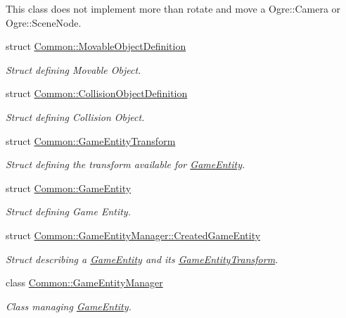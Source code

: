 \begin{DoxyCompactItemize}
\begin{DoxyCompactList}
This class does not implement more than rotate and move a Ogre\+::\+Camera or Ogre\+::\+Scene\+Node. \end{DoxyCompactList}\item 
struct \hyperlink{struct_common_1_1_movable_object_definition}{Common\+::\+Movable\+Object\+Definition}
\begin{DoxyCompactList}\small\item\em Struct defining Movable Object. \end{DoxyCompactList}\item 
struct \hyperlink{struct_common_1_1_collision_object_definition}{Common\+::\+Collision\+Object\+Definition}
\begin{DoxyCompactList}\small\item\em Struct defining Collision Object. \end{DoxyCompactList}\item 
struct \hyperlink{struct_common_1_1_game_entity_transform}{Common\+::\+Game\+Entity\+Transform}
\begin{DoxyCompactList}\small\item\em Struct defining the transform available for \hyperlink{struct_common_1_1_game_entity}{Game\+Entity}. \end{DoxyCompactList}\item 
struct \hyperlink{struct_common_1_1_game_entity}{Common\+::\+Game\+Entity}
\begin{DoxyCompactList}\small\item\em Struct defining Game Entity. \end{DoxyCompactList}\item 
struct \hyperlink{struct_common_1_1_game_entity_manager_1_1_created_game_entity}{Common\+::\+Game\+Entity\+Manager\+::\+Created\+Game\+Entity}
\begin{DoxyCompactList}\small\item\em Struct describing a \hyperlink{struct_common_1_1_game_entity}{Game\+Entity} and its \hyperlink{struct_common_1_1_game_entity_transform}{Game\+Entity\+Transform}. \end{DoxyCompactList}\item 
class \hyperlink{class_common_1_1_game_entity_manager}{Common\+::\+Game\+Entity\+Manager}
\begin{DoxyCompactList}\small\item\em Class managing \hyperlink{struct_common_1_1_game_entity}{Game\+Entity}. \end{DoxyCompactList}\item 

\end{DoxyCompactItemize}
